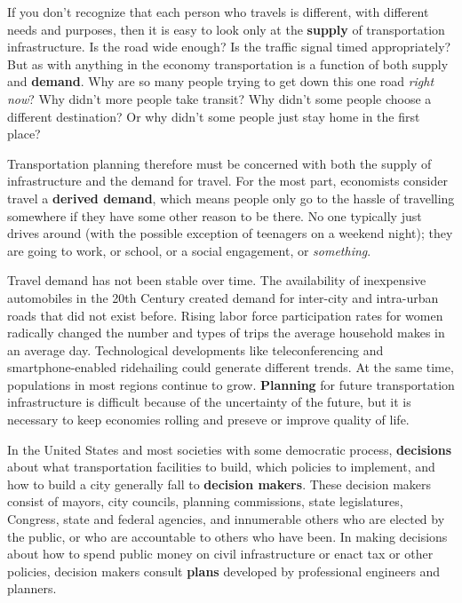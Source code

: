 \documentclass[]{book}
\begin{document}
If you don't recognize that each person who travels is different, with different
needs and purposes, then it is easy to look only at the \textbf{supply} of transportation
infrastructure. Is the road wide enough? Is the traffic signal timed appropriately?
But as with anything in the economy transportation is a function of both supply
and \textbf{demand}. Why are so many people trying to get down this one road \emph{right now}?
Why didn't more people take transit? Why didn't some people choose a different
destination? Or why didn't some people just stay home in the first place?

Transportation planning therefore must be concerned with both the supply of
infrastructure and the demand for travel. For the most part, economists consider
travel a \textbf{derived demand}, which means people only go to the hassle of
travelling somewhere if they have some other reason to be there. No one
typically just drives around (with the possible exception of teenagers on a
weekend night); they are going to work, or school, or a social engagement, or
\emph{something}.

Travel demand has not been stable over time. The availability of inexpensive
automobiles in the 20th Century created demand for inter-city and intra-urban
roads that did not exist before. Rising labor force participation rates for
women radically changed the number and types of trips the average household
makes in an average day. Technological developments like teleconferencing and
smartphone-enabled ridehailing could generate different trends. At the same
time, populations in most regions continue to grow. \textbf{Planning} for future
transportation infrastructure is difficult because of the uncertainty of the
future, but it is necessary to keep economies rolling and preseve or improve
quality of life.

In the United States and most societies with some democratic process,
\textbf{decisions} about what transportation facilities to build, which policies to
implement, and how to build a city generally fall to \textbf{decision makers}. These
decision makers consist of mayors, city councils, planning commissions,
state legislatures, Congress, state and federal agencies, and innumerable others
who are elected by the public, or who are accountable to others who have been.
In making decisions about how to spend public money on civil infrastructure or
enact tax or other policies, decision makers consult \textbf{plans} developed by
professional engineers and planners.
\end{document}
